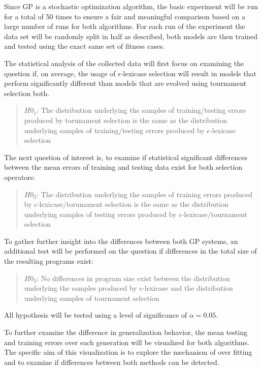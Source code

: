 \documentclass[
  12pt,
]{article}
\begin{document}
Since GP is a stochastic optimization algorithm, the basic experiment
will be run for a total of 50 times to ensure a fair and meaningful
comparison based on a large number of runs for both algorithms. For each
run of the experiment the data set will be randomly split in half as
described, both models are then trained and tested using the exact same
set of fitness cases.

The statistical analysis of the collected data will first focus on
examining the question if, on average, the usage of
\(\epsilon\)-lexicase selection will result in models that perform
significantly different than models that are evolved using tournament
selection both.

\begin{quote}
\(H0_{1}\): The distribution underlying the samples of training/testing
errors produced by torunament selection is the same as the distribution
underlying samples of training/testing errors produced by
\(\epsilon\)-lexicase selection
\end{quote}

The next question of interest is, to examine if statistical significant
differences between the mean errors of training and testing data exist
for both selection operators:

\begin{quote}
\(H0_{2}\): The distribution underlying the samples of training errors
produced by \(\epsilon\)-lexicase/torunament selection is the same as
the distribution underlying samples of testing errors produced by
\(\epsilon\)-lexicase/tournament selection
\end{quote}

To gather further insight into the differences between both GP systems,
an additional test will be performed on the question if differences in
the total size of the resulting programs exist:

\begin{quote}
\(H0_{3}\): No differences in program size exist between the
distribution underlying the samples produced by \(\epsilon\)-lexicase
and the distribution underlying samples of tournament selection
\end{quote}

All hypothesis will be tested using a level of significance of
\(\alpha=0.05\).

To further examine the difference in generalization behavior, the mean
testing and training errors over each generation will be visualized for
both algorithms. The specific aim of this visualization is to explore
the mechanism of over fitting and to examine if differences between both
methods can be detected.
\end{document}

